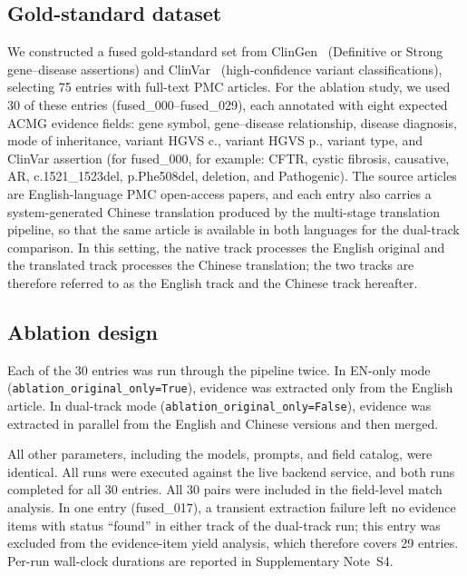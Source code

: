 \documentclass[preprint,12pt]{elsarticle}
\begin{document}
\subsection{Gold-standard dataset}

We constructed a fused gold-standard set from ClinGen~\cite{rehm2015}
(Definitive or Strong gene--disease assertions) and
ClinVar~\cite{landrum2014} (high-confidence variant classifications),
selecting 75 entries with full-text PMC articles. For the ablation study,
we used 30 of these entries (fused\_000--fused\_029), each annotated with
eight expected ACMG evidence fields: gene symbol, gene--disease
relationship, disease diagnosis, mode of inheritance, variant HGVS c.,
variant HGVS p., variant type, and ClinVar assertion (for fused\_000, for
example: CFTR, cystic fibrosis, causative, AR, c.1521\_1523del,
p.Phe508del, deletion, and Pathogenic). The source articles are
English-language PMC open-access papers, and each entry also carries a
system-generated Chinese translation produced by the multi-stage
translation pipeline, so that the same article is available in both
languages for the dual-track comparison. In this setting, the native
track processes the English original and the translated track processes
the Chinese translation; the two tracks are therefore referred to as the
English track and the Chinese track hereafter.

\subsection{Ablation design}

Each of the 30 entries was run through the pipeline twice. In EN-only
mode (\texttt{ablation\_original\_only=True}), evidence was extracted
only from the English article. In dual-track mode
(\texttt{ablation\_original\_only=False}), evidence was extracted in
parallel from the English and Chinese versions and then merged.

All other parameters, including the models, prompts, and field catalog,
were identical. All runs were executed against the live backend service,
and both runs completed for all 30 entries. All 30 pairs were included in
the field-level match analysis. In one entry (fused\_017), a transient
extraction failure left no evidence items with status ``found'' in either
track of the dual-track run; this entry was excluded from the
evidence-item yield analysis, which therefore covers 29 entries. Per-run
wall-clock durations are reported in Supplementary Note~S4.
\end{document}
